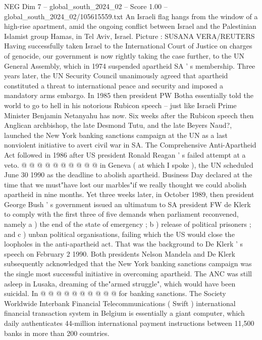 \begin{textsample}{NEG Dim 7 – global\_south\_2024\_02 – Score 1.00 – global\_south\_2024\_02/105615559.txt}  \label{ex:f7_neg_258}
An Israeli flag hangs from the window of a high-rise apartment, amid the ongoing conflict between Israel and the Palestinian Islamist group Hamas, in Tel Aviv, Israel.
Picture : SUSANA VERA/REUTERS Having successfully taken Israel to the International Court of Justice on charges of genocide, our government is now rightly taking the case further, to the UN General Assembly, which in 1974 suspended apartheid SA ' s membership.
Three years later, the UN Security Council unanimously agreed that apartheid constituted a threat to international peace and security and imposed a mandatory arms embargo.
In 1985 then president PW Botha essentially told the world to go to hell in his notorious Rubicon speech -- just like Israeli Prime Minister Benjamin Netanyahu has now.
Six weeks after the Rubicon speech then Anglican archbishop, the late Desmond Tutu, and the late Beyers Naud?, launched the New York banking sanctions campaign at the UN as a last nonviolent initiative to avert civil war in SA.
The Comprehensive Anti-Apartheid Act followed in 1986 after US president Ronald Reagan ' s failed attempt at a veto. @ @ @ @ @ @ @ @ @ @ in Geneva ( at which I spoke ), the UN scheduled June 30 1990 as the deadline to abolish apartheid.
Business Day declared at the time that we must"have lost our marbles"if we really thought we could abolish apartheid in nine months.
Yet three weeks later, in October 1989, then president George Bush ' s government issued an ultimatum to SA president FW de Klerk to comply with the first three of five demands when parliament reconvened, namely a ) the end of the state of emergency ; b ) release of political prisoners ; and c ) unban political organisations, failing which the US would close the loopholes in the anti-apartheid act.
That was the background to De Klerk ' s speech on February 2 1990.
Both presidents Nelson Mandela and De Klerk subsequently acknowledged that the New York banking sanctions campaign was the single most successful initiative in overcoming apartheid.
The ANC was still asleep in Lusaka, dreaming of the"armed struggle", which would have been suicidal.
In @ @ @ @ @ @ @ @ @ @ for banking sanctions.
The Society Worldwide Interbank Financial Telecommunications ( Swift ) international financial transaction system in Belgium is essentially a giant computer, which daily authenticates 44-million international payment instructions between 11,500 banks in more than 200 countries.

\end{textsample}

